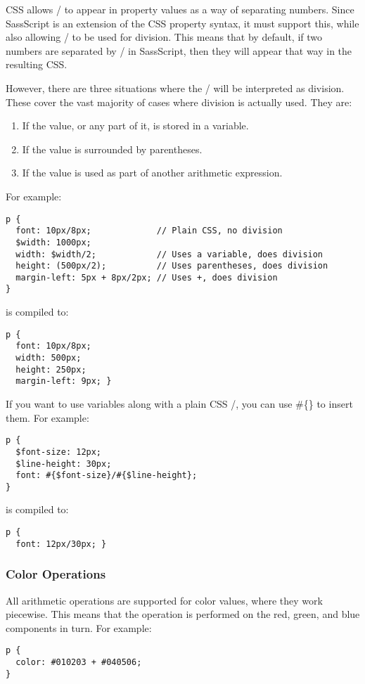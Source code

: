 \documentclass[9pt]{article}
\begin{document}
 CSS allows / to appear in property values as a way of separating numbers. Since SassScript is an extension of the CSS property syntax, it must support this, while also allowing / to be used for division. This means that by default, if two numbers are separated by / in SassScript, then they will appear that way in the resulting CSS.


 However, there are three situations where the / will be interpreted as division. These cover the vast majority of cases where division is actually used. They are:
\begin{enumerate}
\item If the value, or any part of it, is stored in a variable.
\item If the value is surrounded by parentheses.
\item If the value is used as part of another arithmetic expression.

\end{enumerate}


 For example:
\begin{verbatim}
p {
  font: 10px/8px;             // Plain CSS, no division
  $width: 1000px;
  width: $width/2;            // Uses a variable, does division
  height: (500px/2);          // Uses parentheses, does division
  margin-left: 5px + 8px/2px; // Uses +, does division
}
\end{verbatim}


 is compiled to:
\begin{verbatim}
p {
  font: 10px/8px;
  width: 500px;
  height: 250px;
  margin-left: 9px; }
\end{verbatim}


 If you want to use variables along with a plain CSS /, you can use \#\{\} to insert them. For example:
\begin{verbatim}
p {
  $font-size: 12px;
  $line-height: 30px;
  font: #{$font-size}/#{$line-height};
}
\end{verbatim}


 is compiled to:
\begin{verbatim}
p {
  font: 12px/30px; }
\end{verbatim}
\subsubsection{Color Operations}


 All arithmetic operations are supported for color values, where they work piecewise. This means that the operation is performed on the red, green, and blue components in turn. For example:
\begin{verbatim}
p {
  color: #010203 + #040506;
}
\end{verbatim}
\end{document}
